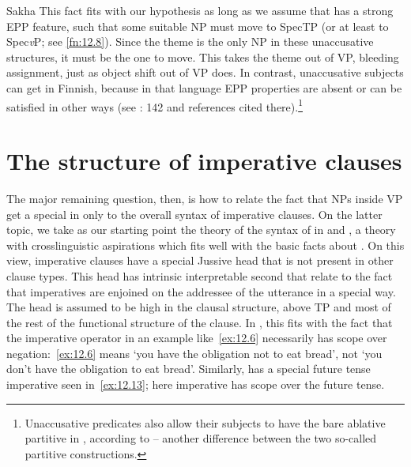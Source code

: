 \documentclass[output=paper]{langsci/langscibook}
\begin{document}
\ea\label{ex:12.12}Sakha
	\z
\z
This fact fits with our hypothesis as long as we assume that  has a
strong \gls{EPP} feature, such that some suitable NP must move to
SpecTP (or at least to Spec\emph{v}\textsubscript{\Imp}P; see \cref{fn:12.8}).
Since the theme is the only NP in these unaccusative structures, it must be the
one to move. This takes the theme out of VP, bleeding 
assignment, just as object shift out of VP does.  In contrast, unaccusative
subjects can get  in Finnish, because in that language EPP
properties are absent or can be satisfied in other ways (see
\citealt{Baker2015}: 142 and references cited there).\footnote{Unaccusative
    predicates also allow their subjects to have the bare ablative partitive in
    , according to \textcite{Kornfilt1990,Kornfilt1996} -- another
difference between the two so-called partitive constructions.}

\section{The structure of imperative clauses}\largerpage[1]

The major remaining question, then, is how to relate the fact that NPs inside
VP get a special  in  only to the overall syntax of
imperative clauses. On the latter topic, we take as our starting point the
theory of the syntax of  in \citet{Zanuttini2008} and
\citet{ZanPakPor2012}, a theory with crosslinguistic aspirations which fits
well with the basic facts about . On this view, imperative clauses have a
special Jussive head that is not present in other clause types. This head has
intrinsic interpretable second  that relate to the fact that
imperatives are enjoined on the addressee of the utterance in a special way.
The head is assumed to be high in the clausal structure, above TP and most of
the rest of the functional structure of the clause. In , this fits with
the fact that the imperative operator in an example like~\eqref{ex:12.6} necessarily has
scope over negation:~\eqref{ex:12.6} means ‘you have the obligation not to eat bread’, not
‘you don’t have the obligation to eat bread’. Similarly,  has a special
future tense imperative seen in~\eqref{ex:12.13}; here imperative has scope over the future
tense.
\end{document}
